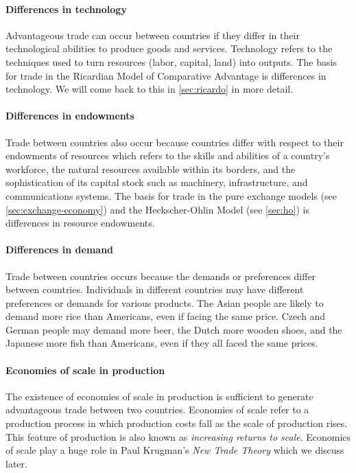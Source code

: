 	\paragraph{Differences in technology}
	Advantageous trade can occur between countries if they differ in their technological abilities to produce goods and services. Technology refers to the techniques used to turn resources (labor, capital, land) into outputs. The basis for trade in the Ricardian Model of Comparative Advantage is differences in technology. We will come back to this in \autoref{sec:ricardo} in more detail.
	
	\paragraph{Differences in endowments}	
	Trade between countries also occur because countries differ with respect to their endowments of resources which refers to the skills and abilities of a country's workforce, the natural resources available within its borders, and the sophistication of its capital stock such as machinery, infrastructure, and communications systems. The basis for trade in the pure exchange models (see \autoref{sec:exchange-economy}) and the Heckscher-Ohlin Model (see \autoref{sec:ho}) is differences in resource endowments.
	
	\paragraph{Differences in demand}
	Trade between countries occurs because the demands or preferences differ between countries. Individuals in different countries may have different preferences or demands for various products. The Asian people are likely to demand more rice than Americans, even if facing the same price. Czech and German people may demand more beer, the Dutch more wooden shoes, and the Japanese more fish than Americans, even if they all faced the same prices.
	
	\paragraph{Economies of scale in production}
	The existence of economies of scale in production is sufficient to generate advantageous trade between two countries. Economies of scale refer to a production process in which production costs fall as the scale of production rises. This feature of production is also known as \textit{increasing returns to scale}. Economics of scale play a huge role in Paul Krugman's \textit{New Trade Theory} which we discuss later.  
	
